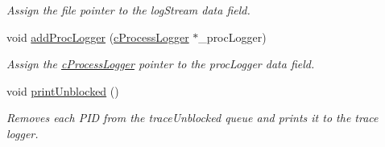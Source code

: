 \begin{DoxyCompactItemize}
\begin{DoxyCompactList}\small\item\em \-Assign the file pointer to the log\-Stream data field. \end{DoxyCompactList}\item 
\hypertarget{classcRoundRobin_a728fa415647d6c71b32ee8d4a04580e1}{void \hyperlink{classcRoundRobin_a728fa415647d6c71b32ee8d4a04580e1}{add\-Proc\-Logger} (\hyperlink{classcProcessLogger}{c\-Process\-Logger} $\ast$\-\_\-proc\-Logger)}\label{dc/dcc/classcRoundRobin_a728fa415647d6c71b32ee8d4a04580e1}

\begin{DoxyCompactList}\small\item\em \-Assign the \hyperlink{classcProcessLogger}{c\-Process\-Logger} pointer to the proc\-Logger data field. \end{DoxyCompactList}\item 
\hypertarget{classcRoundRobin_a3df89085fb98c328b7db6bfc0ee9f9f9}{void \hyperlink{classcRoundRobin_a3df89085fb98c328b7db6bfc0ee9f9f9}{print\-Unblocked} ()}\label{dc/dcc/classcRoundRobin_a3df89085fb98c328b7db6bfc0ee9f9f9}

\begin{DoxyCompactList}\small\item\em \-Removes each \-P\-I\-D from the trace\-Unblocked queue and prints it to the trace logger. \end{DoxyCompactList}\end{DoxyCompactItemize}
